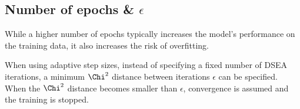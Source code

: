 \subsection{Number of epochs \& $\epsilon$}
While a higher number of epochs typically increases the model's performance on the training data,
it also increases the risk of overfitting.


When using adaptive step sizes,
instead of specifying a fixed number of DSEA iterations,
a minimum $\Chi^2$ distance between iterations $\epsilon$
can be specified.
When the $\Chi^2$ distance becomes smaller than $\epsilon$,
convergence is assumed and the training is stopped.
